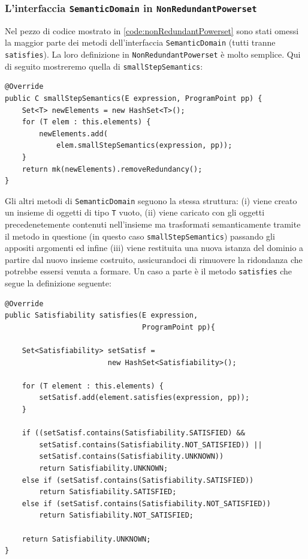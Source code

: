\subsubsection{L'interfaccia \texttt{SemanticDomain} in \texttt{NonRedundantPowerset}}
Nel pezzo di codice mostrato in \ref{code:nonRedundantPowerset} sono stati omessi la maggior parte dei metodi dell'interfaccia \texttt{SemanticDomain} (tutti tranne \texttt{satisfies}). La loro definizione in \texttt{NonRedundantPowerset} è molto semplice. Qui di seguito mostreremo quella di \texttt{smallStepSemantics}:
\begin{lstlisting}[belowskip=-1.1 \baselineskip]
@Override
public C smallStepSemantics(E expression, ProgramPoint pp) {
    Set<T> newElements = new HashSet<T>();
    for (T elem : this.elements) {
        newElements.add(
            elem.smallStepSemantics(expression, pp));
    }
    return mk(newElements).removeRedundancy();
}
\end{lstlisting}
Gli altri metodi di \texttt{SemanticDomain} seguono la stessa struttura: (i) viene creato un insieme di oggetti di tipo \texttt{T} vuoto, (ii) viene caricato con gli oggetti precedenetemente contenuti nell'insieme ma trasformati semanticamente tramite il metodo in questione (in questo caso \texttt{smallStepSemantics}) passando gli appositi argomenti ed infine (iii) viene restituita una nuova istanza del dominio a partire dal nuovo insieme costruito, assicurandoci di rimuovere la ridondanza che potrebbe essersi venuta a formare. 
Un caso a parte è il metodo \texttt{satisfies} che segue la definizione seguente:
\begin{lstlisting}[belowskip=-1.1 \baselineskip]
@Override
public Satisfiability satisfies(E expression, 
                                ProgramPoint pp){
    
    Set<Satisfiability> setSatisf = 
                        new HashSet<Satisfiability>();

    for (T element : this.elements) {
        setSatisf.add(element.satisfies(expression, pp));
    }

    if ((setSatisf.contains(Satisfiability.SATISFIED) &&    
        setSatisf.contains(Satisfiability.NOT_SATISFIED)) ||
        setSatisf.contains(Satisfiability.UNKNOWN))
        return Satisfiability.UNKNOWN;
    else if (setSatisf.contains(Satisfiability.SATISFIED))
        return Satisfiability.SATISFIED;
    else if (setSatisf.contains(Satisfiability.NOT_SATISFIED))
        return Satisfiability.NOT_SATISFIED;

    return Satisfiability.UNKNOWN;
}
\end{lstlisting}